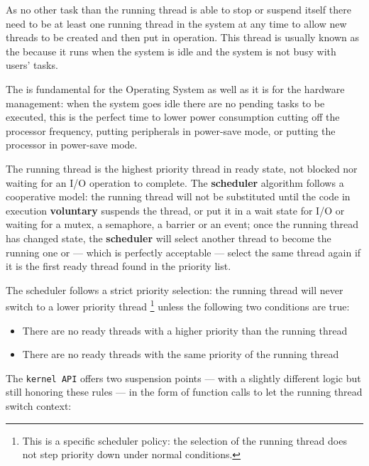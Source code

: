 \documentclass[11pt,b5paper]{scrbook}
\begin{document}
As no other task 
than the running thread is able to stop or suspend itself there need to be at least one running thread
in the system at any time to allow new threads to be created and then put in operation.
This thread is usually known as the  because it runs when the system is idle and the system is not busy with users' tasks.

The  is fundamental for the Operating System as well as it is for the hardware management:
when the system goes idle there are no pending tasks to be executed, this is the perfect time to lower power consumption cutting off
the processor frequency, putting peripherals in power-save mode, or putting the processor in power-save mode.

The running thread 
is the highest priority thread in ready state, not blocked nor waiting for an I/O operation to complete.
The \textbf{scheduler} algorithm follows a cooperative model: the running thread will not be substituted until the code in execution
\textbf{voluntary} suspends the thread, or put it in a wait state for I/O or waiting for a mutex, a
semaphore, a barrier or an event; once the running thread has changed state, the
\textbf{scheduler} will select another thread to become the running one or --- which is perfectly acceptable ---
select the same thread again if it is the first ready thread found in the priority list.

The scheduler follows a strict priority selection: the running thread will never
switch to a lower priority thread \footnote{This is a specific scheduler policy: the selection of the
running thread does not step priority down under normal conditions.}
unless the following two conditions are true:

\hfill
\begin{tcolorbox}[enhanced, colframe=CadetBlue!80!White, leftrule=3mm, top=5mm, bottom=5mm, halign=center, drop fuzzy shadow]
\begin{itemize}
\item There are no ready threads with a higher priority than the running thread
\item There are no ready threads with the same priority of the running thread
\end{itemize}
\end{tcolorbox}
\hfill

The \texttt{kernel API} offers two suspension points --- with a slightly different logic but still
honoring these rules --- in the form of function calls to let the running thread switch context:
\end{document}
